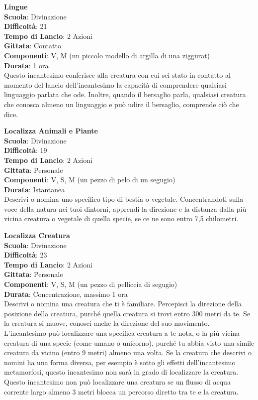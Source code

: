 \begin{multicols}{2}
\medskip\textbf{Lingue}\\
\textbf{Scuola}: Divinazione\\
\textbf{Difficoltà}: 21\\
\textbf{Tempo di Lancio}: 2 Azioni\\
\textbf{Gittata}: Contatto\\
\textbf{Componenti}: V, M (un piccolo modello di argilla di una ziggurat)\\
\textbf{Durata}: 1 ora\\
Questo incantesimo conferisce alla creatura con cui sei stato in contatto al momento del lancio dell'incantesimo la capacità di comprendere qualsiasi linguaggio parlata che ode. Inoltre, quando il bersaglio parla, qualsiasi creatura che conosca almeno un linguaggio e può udire il bersaglio, comprende ciò che dice.

\medskip\textbf{Localizza Animali e Piante}\\
\textbf{Scuola}: Divinazione\\
\textbf{Difficoltà}: 19\\
\textbf{Tempo di Lancio}: 2 Azioni\\
\textbf{Gittata}: Personale\\
\textbf{Componenti}: V, S, M (un pezzo di pelo di un segugio) \\
\textbf{Durata}: Istantanea\\
Descrivi o nomina uno specifico tipo di bestia o vegetale. Concentrandoti sulla voce della natura nei tuoi dintorni, apprendi la direzione e la distanza dalla più vicina creatura o vegetale di quella specie, se ce ne sono entro 7,5 chilometri.

\medskip\textbf{Localizza Creatura}\\
\textbf{Scuola}: Divinazione\\
\textbf{Difficoltà}: 23\\
\textbf{Tempo di Lancio}: 2 Azioni\\
\textbf{Gittata}: Personale\\
\textbf{Componenti}: V, S, M (un pezzo di pelliccia di segugio)\\
\textbf{Durata}: Concentrazione, massimo 1 ora\\
Descrivi o nomina una creatura che ti è familiare. Percepisci la direzione della posizione della creatura, purché quella creatura si trovi entro 300 metri da te. Se la creatura si muove, conosci anche la direzione del suo movimento.\\
L'incantesimo può localizzare una specifica creatura a te nota, o la più vicina creatura di una specie (come umano o unicorno), purché tu abbia visto una simile creatura da vicino (entro 9 metri) almeno una volta. Se la creatura che descrivi o nomini ha una forma diversa, per esempio è sotto gli effetti dell'incantesimo metamorfosi, questo incantesimo non sarà in grado di localizzare la creatura.\\
Questo incantesimo non può localizzare una creatura se un flusso di acqua corrente largo almeno 3 metri blocca un percorso diretto tra te e la creatura.


\end{multicols}
